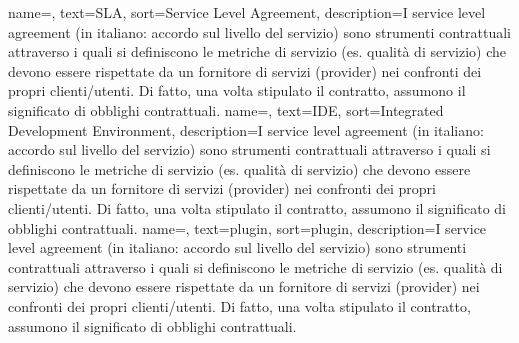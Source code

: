 {
	name=,
	text=SLA,
	sort=Service Level Agreement,
	description={I service level agreement (in italiano: accordo sul livello del servizio) sono strumenti contrattuali attraverso i quali si definiscono le metriche di servizio (es. qualità di servizio) che devono essere rispettate da un fornitore di servizi (provider) nei confronti dei propri clienti/utenti. Di fatto, una volta stipulato il contratto, assumono il significato di obblighi contrattuali.}
}
{
	name=,
	text=IDE,
	sort=Integrated Development Environment,
	description={I service level agreement (in italiano: accordo sul livello del servizio) sono strumenti contrattuali attraverso i quali si definiscono le metriche di servizio (es. qualità di servizio) che devono essere rispettate da un fornitore di servizi (provider) nei confronti dei propri clienti/utenti. Di fatto, una volta stipulato il contratto, assumono il significato di obblighi contrattuali.}
}
{
	name=,
	text=plugin,
	sort=plugin,
	description={I service level agreement (in italiano: accordo sul livello del servizio) sono strumenti contrattuali attraverso i quali si definiscono le metriche di servizio (es. qualità di servizio) che devono essere rispettate da un fornitore di servizi (provider) nei confronti dei propri clienti/utenti. Di fatto, una volta stipulato il contratto, assumono il significato di obblighi contrattuali.}
}